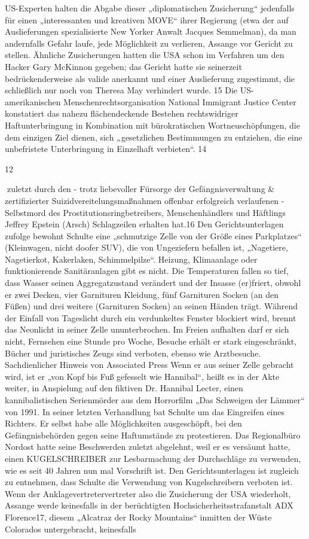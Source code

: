 \begin{multicols}{2}
US-Experten halten die Abgabe dieser „diplomatischen Zusicherung“ jedenfalls für einen „interessanten und
kreativen MOVE“ ihrer Regierung (etwa der auf Auslieferungen spezialisierte New Yorker Anwalt Jacques Semmelman), da man andernfalls Gefahr laufe, jede Möglichkeit zu verlieren, Assange vor Gericht zu stellen. Ähnliche Zusicherungen hatten die USA schon im Verfahren um den Hacker Gary McKinnon gegeben; das Gericht
hatte sie seinerzeit bedrückenderweise als valide anerkannt und einer Auslieferung zugestimmt, die schließlich
nur noch von Theresa May verhindert wurde.
15
Die US-amerikanischen Menschenrechtsorganisation National Immigrant Justice Center konstatiert das nahezu flächendeckende Bestehen rechtswidriger Haftunterbringung in Kombination mit bürokratischen Wortneuschöpfungen, die dem einzigen Ziel dienen, sich „gesetzlichen Bestimmungen zu entziehen, die eine unbefristete Unterbringung in Einzelhaft verbieten“.
14

12

zuletzt durch den - trotz liebevoller Fürsorge der Gefängnisverwaltung \& zertifizierter Suizidvereitelungsmaßnahmen offenbar erfolgreich verlaufenen - Selbstmord
des Prostitutionsringbetreibers, Menschenhändlers und
Häftlings Jeffrey Epstein (Arsch) Schlagzeilen erhalten
hat.16
Den Gerichtsunterlagen zufolge bewohnt Schulte eine
„schmutzige Zelle von der Größe eines Parkplatzes“
(Kleinwagen, nicht doofer SUV), die von Ungeziefern
befallen ist, „Nagetiere, Nagetierkot, Kakerlaken, Schimmelpilze“. Heizung, Klimaanlage oder funktionierende
Sanitäranlagen gibt es nicht. Die Temperaturen fallen so
tief, dass Wasser seinen Aggregatzustand verändert und
der Insasse (er)friert, obwohl er zwei Decken, vier Garnituren Kleidung, fünf Garnituren Socken (an den Füßen)
und drei weitere (Garnituren Socken) an seinen Händen
trägt.
Während der Einfall von Tageslicht durch ein verdunkeltes Fenster blockiert wird, brennt das Neonlicht in seiner
Zelle ununterbrochen. Im Freien aufhalten darf er sich
nicht, Fernsehen eine Stunde pro Woche, Besuche erhält
er stark eingeschränkt, Bücher und juristisches Zeugs
sind verboten, ebenso wie Arztbesuche.
Sachdienlicher Hinweis von Associated Press
Wenn er aus seiner Zelle gebracht wird, ist er „von Kopf bis
Fuß gefesselt wie Hannibal“, heißt es in der Akte weiter,
in Anspielung auf den fiktiven Dr. Hannibal Lecter, einen
kannibalistischen Serienmörder aus dem Horrorfilm
„Das Schweigen der Lämmer“ von 1991.
In seiner letzten Verhandlung bat Schulte um das Eingreifen eines Richters. Er selbst habe alle Möglichkeiten
ausgeschöpft, bei den Gefängnisbehörden gegen seine
Haftumstände zu protestieren. Das Regionalbüro Nordost hatte seine Beschwerden zuletzt abgelehnt, weil er es
versäumt hatte, einen KUGELSCHREIBER zur Lesbarmachung der Durchschläge zu verwenden, wie es seit 40
Jahren nun mal Vorschrift ist. Den Gerichtsunterlagen ist
zugleich zu entnehmen, dass Schulte die Verwendung
von Kugelschreibern verboten ist.
Wenn der Anklagevertretervertreter also die Zusicherung der USA wiederholt, Assange werde keinesfalls
in der berüchtigten Hochsicherheitsstrafanstalt ADX
Florence17, diesem „Alcatraz der Rocky Mountains“ inmitten der Wüste Colorados untergebracht, keinesfalls


\end{multicols}

